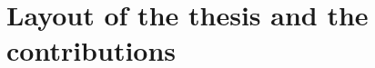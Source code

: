 \documentclass[twoside,11pt]{book}
\newtheorem{theorem}{Theorem}
\numberwithin{theorem}{chapter}
\numberwithin{definition}{chapter}
\numberwithin{proposition}{chapter}
\numberwithin{corollary}{chapter}
\numberwithin{example}{chapter}
\numberwithin{lemma}{chapter}
\numberwithin{assumption}{chapter}
\numberwithin{equation}{chapter}
\numberwithin{figure}{chapter}
\DeclareMathOperator{\Det}{Det}
\DeclareMathOperator{\Tran}{\intercal}
\DeclareMathOperator{\Prb}{\mathbb{P}}
\begin{document}











\section{Layout of the thesis and the contributions}

\end{document}
